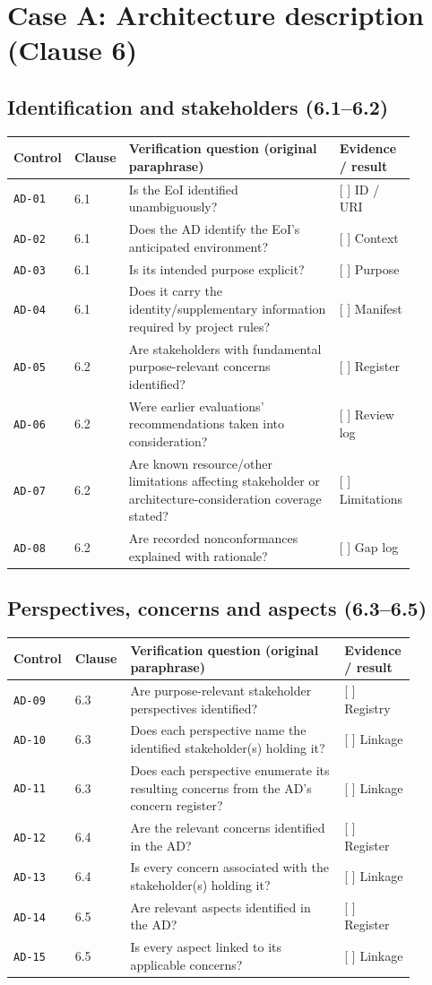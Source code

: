 \documentclass[11pt,letterpaper]{article}
\newcommand{\AuditingHead}{\begin{longtable}{p{0.10\linewidth}p{0.10\linewidth}p{0.52\linewidth}p{0.17\linewidth}}\toprule\textbf{Control}&\textbf{Clause}&\textbf{Verification question (original paraphrase)}&\textbf{Evidence / result}\\\midrule\endhead}
\newcommand{\AuditingEnd}{\bottomrule\end{longtable}}
\newcommand{\AuditRow}[4]{\texttt{#1} & #2 & #3 & #4\\}
\begin{document}
\section{Case A: Architecture description (Clause 6)}
\subsection{Identification and stakeholders (6.1--6.2)}
\AuditingHead
\AuditRow{AD-01}{6.1}{Is the EoI identified unambiguously?}{[ ] ID / URI}
\AuditRow{AD-02}{6.1}{Does the AD identify the EoI's anticipated environment?}{[ ] Context}
\AuditRow{AD-03}{6.1}{Is its intended purpose explicit?}{[ ] Purpose}
\AuditRow{AD-04}{6.1}{Does it carry the identity/supplementary information required by project rules?}{[ ] Manifest}
\AuditRow{AD-05}{6.2}{Are stakeholders with fundamental purpose-relevant concerns identified?}{[ ] Register}
\AuditRow{AD-06}{6.2}{Were earlier evaluations' recommendations taken into consideration?}{[ ] Review log}
\AuditRow{AD-07}{6.2}{Are known resource/other limitations affecting stakeholder or architecture-consideration coverage stated?}{[ ] Limitations}
\AuditRow{AD-08}{6.2}{Are recorded nonconformances explained with rationale?}{[ ] Gap log}
\AuditingEnd
\subsection{Perspectives, concerns and aspects (6.3--6.5)}
\AuditingHead
\AuditRow{AD-09}{6.3}{Are purpose-relevant stakeholder perspectives identified?}{[ ] Registry}
\AuditRow{AD-10}{6.3}{Does each perspective name the identified stakeholder(s) holding it?}{[ ] Linkage}
\AuditRow{AD-11}{6.3}{Does each perspective enumerate its resulting concerns from the AD's concern register?}{[ ] Linkage}
\AuditRow{AD-12}{6.4}{Are the relevant concerns identified in the AD?}{[ ] Register}
\AuditRow{AD-13}{6.4}{Is every concern associated with the stakeholder(s) holding it?}{[ ] Linkage}
\AuditRow{AD-14}{6.5}{Are relevant aspects identified in the AD?}{[ ] Register}
\AuditRow{AD-15}{6.5}{Is every aspect linked to its applicable concerns?}{[ ] Linkage}
\AuditingEnd
\end{document}
